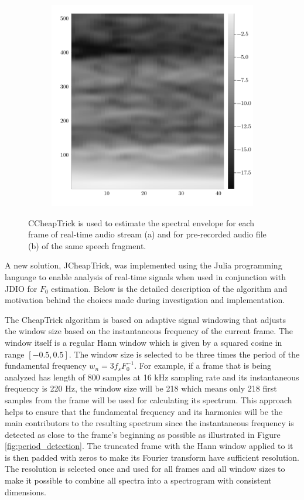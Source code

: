 \documentclass[a4paper]{article}
\begin{document}
\begin{figure}
\begin{subfigure}[b]{0.5\textwidth}
        \includegraphics{graphics/recorded_ccheaptrick.png}
        \caption{}
        \label{fig:recorded_ccheaptrick}
    \end{subfigure}
    \caption{CCheapTrick is used to estimate the spectral envelope for each frame of real-time audio stream (a) and for pre-recorded audio file (b) of the same speech fragment.}
    \label{fig:ccheaptrick}
\end{figure}

A new solution, JCheapTrick, was implemented using the Julia programming language to enable analysis of real-time signals when used in conjunction with JDIO for $F_0$ estimation. Below is the detailed description of the algorithm and motivation behind the choices made during investigation and implementation.

The CheapTrick algorithm is based on adaptive signal windowing that adjusts the window size based on the instantaneous frequency of the current frame. The window itself is a regular Hann window which is given by a squared cosine in range $[-0.5,0.5]$. The window size is selected to be three times the period of the fundamental frequency $w_n = 3f_s F_0^{-1}$. For example, if a frame that is being analyzed has length of 800 samples at 16 kHz sampling rate and its instantaneous frequency is 220 Hz, the window size will be 218 which means only 218 first samples from the frame will be used for calculating its spectrum. This approach helps to ensure that the fundamental frequency and its harmonics will be the main contributors to the resulting spectrum since the instantaneous frequency is detected as close to the frame's beginning as possible as illustrated in Figure \ref{fig:period_detection}. The truncated frame with the Hann window applied to it is then padded with zeros to make its Fourier transform have sufficient resolution. The resolution is selected once and used for all frames and all window sizes to make it possible to combine all spectra into a spectrogram with consistent dimensions.
\end{document}
